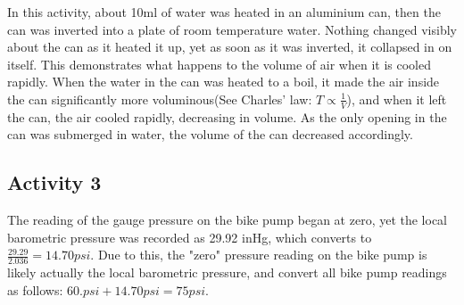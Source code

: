 \documentclass{article}
\begin{document}
In this activity, about 10ml of water was heated in an aluminium can, then the can was inverted into a plate of room temperature water.  Nothing changed visibly about the can as it heated it up, yet as soon as it was inverted, it collapsed in on itself. This demonstrates what happens to the volume of air when it is cooled rapidly. When the water in the can was heated to a boil, it made the air inside the can significantly more voluminous(See Charles' law: $T\propto \frac{1}{V}$), and when it left the can, the air cooled rapidly, decreasing in volume.  As the only opening in the can was submerged in water, the volume of the can decreased accordingly.
\subsection{Activity 3}


The reading of the gauge pressure on the bike pump began at zero, yet the local barometric pressure was recorded as 29.92 inHg, which converts to $\frac{29.29}{2.036}=14.70psi$. Due to this, the "zero" pressure reading on the bike pump is likely actually the local barometric pressure, and convert all bike pump readings as follows: $60.psi+14.70psi = 75psi$.

$\ $
\end{document}
